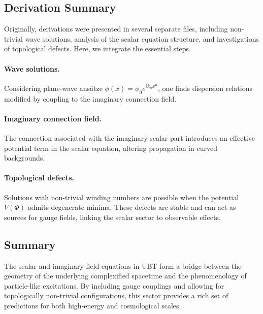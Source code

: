 \subsection{Derivation Summary}

Originally, derivations were presented in several separate files, including
non-trivial wave solutions, analysis of the scalar equation structure, and
investigations of topological defects. Here, we integrate the essential steps.

\paragraph{Wave solutions.} Considering plane-wave ansätze
$\phi(x) = \phi_0 e^{ik_\mu x^\mu}$, one finds dispersion relations modified by
coupling to the imaginary connection field.

\paragraph{Imaginary connection field.} The connection associated with the
imaginary scalar part introduces an effective potential term in the scalar
equation, altering propagation in curved backgrounds.

\paragraph{Topological defects.} Solutions with non-trivial winding numbers are
possible when the potential $V(\Phi)$ admits degenerate minima. These defects
are stable and can act as sources for gauge fields, linking the scalar sector
to observable effects.

\subsection{Summary}

The scalar and imaginary field equations in UBT form a bridge between the
geometry of the underlying complexified spacetime and the phenomenology of
particle-like excitations. By including gauge couplings and allowing for
topologically non-trivial configurations, this sector provides a rich set of
predictions for both high-energy and cosmological scales.
